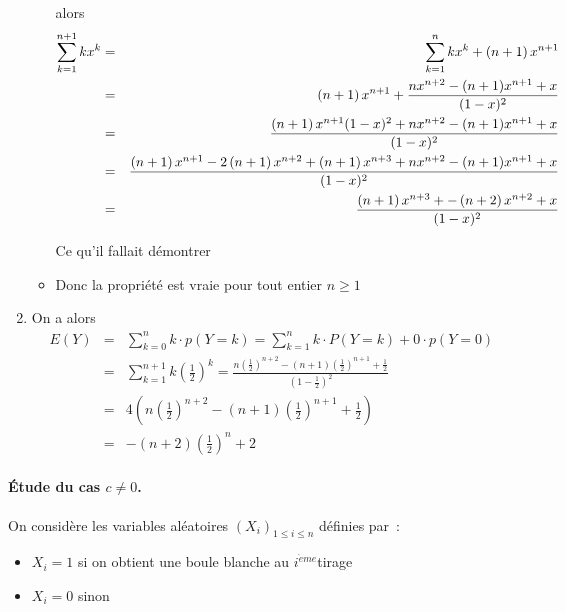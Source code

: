 \begin{correction}
\begin{enumerate}
\begin{itemize}
alors 
\begin{eqnarray*}
\sum_{k=1}^{n+1}kx^{k} &=&\sum_{k=1}^{n}kx^{k}+\left( n+1\right) x^{n+1} \\
&=&\left( n+1\right) x^{n+1}+\frac{nx^{n+2}-(n+1)x^{n+1}+x}{(1-x)^{2}} \\
&=&\frac{\left( n+1\right) x^{n+1}(1-x)^{2}+nx^{n+2}-(n+1)x^{n+1}+x}{%
(1-x)^{2}} \\
&=&\frac{\left( n+1\right) x^{n+1}-2\left( n+1\right) x^{n+2}+\left(
n+1\right) x^{n+3}+nx^{n+2}-(n+1)x^{n+1}+x}{(1-x)^{2}} \\
&=&\frac{\left( n+1\right) x^{n+3}+-\left( n+2\right) x^{n+2}+x}{(1-x)^{2}}
\end{eqnarray*}

Ce qu'il fallait d\'{e}montrer

\item Donc la propri\'{e}t\'{e} est vraie pour tout entier $n\ge 1$
\end{itemize}

\item On a alors 
\begin{eqnarray*}
E\left( Y\right) &=&\sum_{k=0}^{n}k\cdot p\left( Y=k\right)
=\sum_{k=1}^{n}k\cdot P(Y=k)+0\cdot p\left( Y=0\right) \\
&=&\sum_{k=1}^{n+1}k\left( \frac{1}{2}\right) ^{k}=\frac{n\left( \frac{1}{2}%
\right) ^{n+2}-(n+1)\left( \frac{1}{2}\right) ^{n+1}+\frac{1}{2}}{(1-\frac{1%
}{2})^{2}} \\
&=&4\left( n\left( \frac{1}{2}\right) ^{n+2}-(n+1)\left( \frac{1}{2}\right)
^{n+1}+\frac{1}{2}\right) \\
&=&-\left( n+2\right) \left( \frac{1}{2}\right) ^{n}+2
\end{eqnarray*}
\end{enumerate}

\paragraph{\'Etude du cas $c\neq 0$.}

On consid\`{e}re les variables al\'{e}atoires $\left( X_{i}\right)
_{1\leqslant i\leqslant n}$ d\'{e}finies par~:

\begin{itemize}
\item $X_{i}=1$ si on obtient une boule blanche au $i^{\grave{e}me}$tirage

\item $X_{i}=0$ sinon
\end{itemize}


\end{correction}
